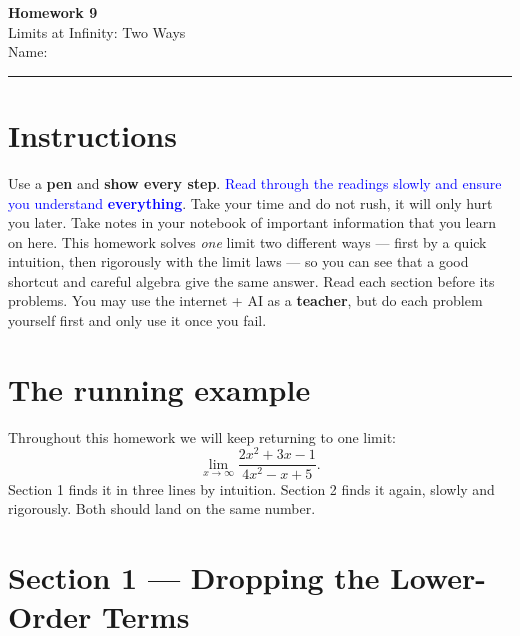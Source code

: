 \documentclass[12pt]{article}
\begin{document}
\pagestyle{fancy}
\begin{center}
  {\Large\bfseries Homework 9}\\[4pt]
  Limits at Infinity: Two Ways\\[6pt]
  Name:\;\underline{\hspace{6.5cm}}\quad
\end{center}
\hrule\bigskip

\section*{Instructions}
Use a \textbf{pen} and \textbf{show every step}. \textcolor{blue}{Read through the readings slowly and ensure you understand \textbf{everything}}. Take your time and do not rush, it will only hurt you later. Take notes in your notebook of important information that you learn on here. This homework solves \emph{one} limit two different ways --- first
by a quick intuition, then rigorously with the limit laws --- so you can see that a good shortcut and careful
algebra give the same answer. Read each section before its problems. You may use the internet + AI as a \textbf{teacher}, but do each problem yourself first and only use it once you fail.

\section*{The running example}
Throughout this homework we will keep returning to one limit:
\[
  \lim_{x \to \infty} \frac{2x^2 + 3x - 1}{4x^2 - x + 5}.
\]
Section 1 finds it in three lines by intuition. Section 2 finds it again, slowly and rigorously. Both should land
on the same number.

\section*{Section 1 --- Dropping the Lower-Order Terms}
\end{document}

